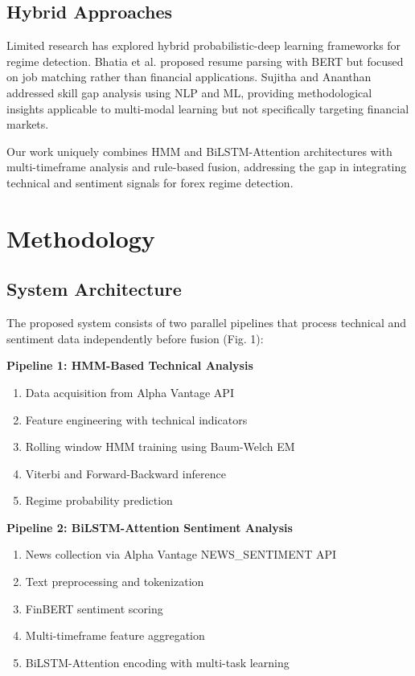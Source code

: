 \documentclass[conference]{IEEEtran}
\begin{document}
\subsection{Hybrid Approaches}
Limited research has explored hybrid probabilistic-deep learning frameworks for regime detection. Bhatia et al. \cite{bhatia2020} proposed resume parsing with BERT but focused on job matching rather than financial applications. Sujitha and Ananthan \cite{sujitha2021} addressed skill gap analysis using NLP and ML, providing methodological insights applicable to multi-modal learning but not specifically targeting financial markets.

Our work uniquely combines HMM and BiLSTM-Attention architectures with multi-timeframe analysis and rule-based fusion, addressing the gap in integrating technical and sentiment signals for forex regime detection.

\section{Methodology}

\subsection{System Architecture}
The proposed system consists of two parallel pipelines that process technical and sentiment data independently before fusion (Fig. 1):

\textbf{Pipeline 1: HMM-Based Technical Analysis}
\begin{enumerate}
\item Data acquisition from Alpha Vantage API
\item Feature engineering with technical indicators
\item Rolling window HMM training using Baum-Welch EM
\item Viterbi and Forward-Backward inference
\item Regime probability prediction
\end{enumerate}

\textbf{Pipeline 2: BiLSTM-Attention Sentiment Analysis}
\begin{enumerate}
\item News collection via Alpha Vantage NEWS\_SENTIMENT API
\item Text preprocessing and tokenization
\item FinBERT sentiment scoring
\item Multi-timeframe feature aggregation
\item BiLSTM-Attention encoding with multi-task learning
\end{enumerate}
\end{document}
